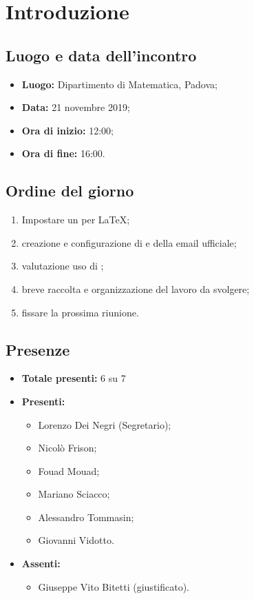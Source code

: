 \section*{Introduzione}

\subsection*{Luogo e data dell'incontro}
	\begin{itemize}
		\item \textbf{Luogo:} Dipartimento di Matematica, Padova;

		\item \textbf{Data:} 21 novembre 2019;
		\item \textbf{Ora di inizio:} 12:00;
		\item \textbf{Ora di fine:} 16:00.
	\end{itemize}

\subsection*{Ordine del giorno}
	\begin{enumerate}

		\item Impostare un  per \LaTeX{};
		\item creazione e configurazione di  e della email ufficiale;
		\item valutazione uso di ;
		\item breve raccolta e organizzazione del lavoro da svolgere;
		\item fissare la prossima riunione.

	\end{enumerate}

\subsection*{Presenze}
	\begin{itemize}
		\item \textbf{Totale presenti:} 6 su 7
		\item \textbf{Presenti: }

			\begin{itemize}			
				\item Lorenzo Dei Negri (Segretario);

				\item Nicolò Frison;
				\item Fouad Mouad;
				\item Mariano Sciacco;
				\item Alessandro Tommasin;
				\item Giovanni Vidotto.
			\end{itemize}

		\item \textbf{Assenti: } 
			\begin{itemize}	

				\item Giuseppe Vito Bitetti (giustificato).
			\end{itemize}
	\end{itemize}


